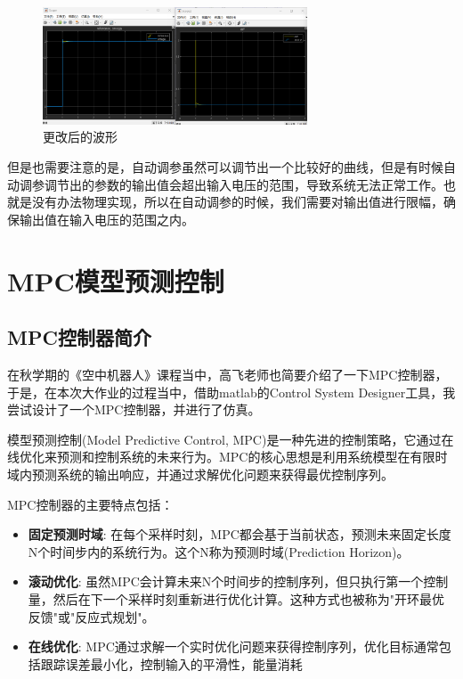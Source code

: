 \documentclass[12pt,a4paper,UTF8]{article}
\begin{document}
\begin{figure}[htbp] \centering \includegraphics[width=0.7\textwidth]{2024-12-30-11-59-15.png} \caption{更改后的波形}\end{figure}

但是也需要注意的是，自动调参虽然可以调节出一个比较好的曲线，但是有时候自动调参调节出的参数的输出值会超出输入电压的范围，导致系统无法正常工作。也就是没有办法物理实现，所以在自动调参的时候，我们需要对输出值进行限幅，确保输出值在输入电压的范围之内。

\clearpage
\section{MPC模型预测控制}
\subsection{MPC控制器简介}
在秋学期的《空中机器人》课程当中，高飞老师也简要介绍了一下MPC控制器，于是，在本次大作业的过程当中，借助matlab的Control System Designer工具，我尝试设计了一个MPC控制器，并进行了仿真。

模型预测控制(Model Predictive Control, MPC)是一种先进的控制策略，它通过在线优化来预测和控制系统的未来行为。MPC的核心思想是利用系统模型在有限时域内预测系统的输出响应，并通过求解优化问题来获得最优控制序列。

MPC控制器的主要特点包括：

\begin{itemize}
\item \textbf{固定预测时域}: 在每个采样时刻，MPC都会基于当前状态，预测未来固定长度N个时间步内的系统行为。这个N称为预测时域(Prediction Horizon)。

\item \textbf{滚动优化}: 虽然MPC会计算未来N个时间步的控制序列，但只执行第一个控制量，然后在下一个采样时刻重新进行优化计算。这种方式也被称为"开环最优反馈"或"反应式规划"。

\item \textbf{在线优化}: MPC通过求解一个实时优化问题来获得控制序列，优化目标通常包括跟踪误差最小化，控制输入的平滑性，能量消耗
\end{itemize}
\end{document}

